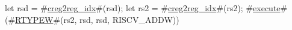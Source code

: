 let rsd = #\hyperref[sailRISCVzcreg2regzyidx]{creg2reg\_idx}#(rsd);
let rs2 = #\hyperref[sailRISCVzcreg2regzyidx]{creg2reg\_idx}#(rs2);
#\hyperref[sailRISCVzexecute]{execute}#(#\hyperref[sailRISCVzRTYPEW]{RTYPEW}#(rs2, rsd, rsd, RISCV_ADDW))
